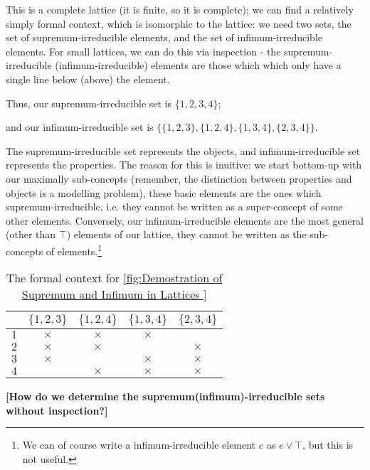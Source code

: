 This is a complete lattice (it is finite, so it is complete); we can find a relatively simply formal context, which is isomorphic to the lattice: we need two sets, the set of supremum-irreducible elements, and the set of infimum-irreducible elements. For small lattices, we can do this via inspection - the supremum-irreducible (infimum-irreducible) elements are those which which only have a single line below (above) the element. 

Thus, our supremum-irreducible set is $\{1,2,3,4\}$; 

and our infimum-irreducible set is $\{\{1,2,3\}, \{1,2,4\}, \{1,3,4\}, \{2,3,4\}\}$. 

The supremum-irreducible set represents the objects, and infimum-irreducible set represents the properties. The reason for this is inuitive: we start bottom-up with our maximally sub-concepts (remember, the distinction between properties and objects is a modelling problem), these basic elements are the ones which supremum-irreducible, i.e. they cannot be written as a super-concept of some other elements. Conversely, our infimum-irreducible elements are the most general (other than $\top$) elements of our lattice, they cannot be written as the sub-concepts of elements.\footnote{We can of course write a  infimum-irreducible element $e$ as $e \lor \top$, but this is not useful.} 

\begin{table}[h]
    \centering
    \caption{The formal context for \ref{fig:Demostration of Supremum and Infimum in Lattices }}
    \begin{tabular}{c|cccc} 
        & $\{1,2,3\}$ & $\{1,2,4\}$ & $\{1,3,4\}$ & $\{2,3,4\}$ \\ \hline
        $1$ & $\times$ & $\times$ & $\times$ & \\ 
        $2$ & $\times$ & $\times$ & & $\times$ \\ 
        $3$ & $\times$ & & $\times$ & $\times$ \\ 
        $4$ & & $\times$ & $\times$ & $\times$   
    \end{tabular}
\end{table}

\textbf{[How do we determine the supremum(infimum)-irreducible sets without inspection?]} 